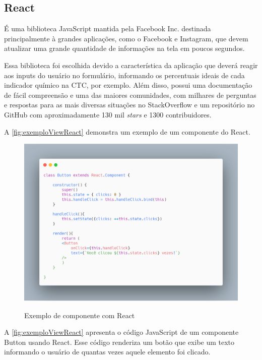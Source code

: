 \subsection{React}
\label{sub:react}

É uma biblioteca JavaScript mantida pela Facebook Inc. destinada principalmente à grandes aplicações, como o Facebook e Instagram, que devem atualizar uma grande quantidade de informações na tela em poucos segundos.

Essa biblioteca foi escolhida devido a característica da aplicação que deverá reagir aos inputs do usuário no formulário, informando os percentuais ideais de cada indicador químico na CTC, por exemplo. Além disso, possui uma documentação de fácil compreensão e uma das maiores comunidades, com milhares de perguntas e respostas para as mais diversas situações no StackOverflow e um repositório no GitHub com aproximadamente 130 mil \textit{stars} e 1300 contribuidores. 

A \autoref{fig:exemploViewReact} demonstra um exemplo de um componente do React. 

\begin{figure}[H]
    \centering
    \caption{Exemplo de componente com React}
    \includegraphics[width=13cm]{dados/figuras/exemplo_react_component.png}
    \label{fig:exemploViewReact}
\end{figure}

A \autoref{fig:exemploViewReact} apresenta o código JavaScript de um componente Button usando React. Esse código renderiza um botão que exibe um texto informando o usuário de quantas vezes aquele elemento foi clicado.

